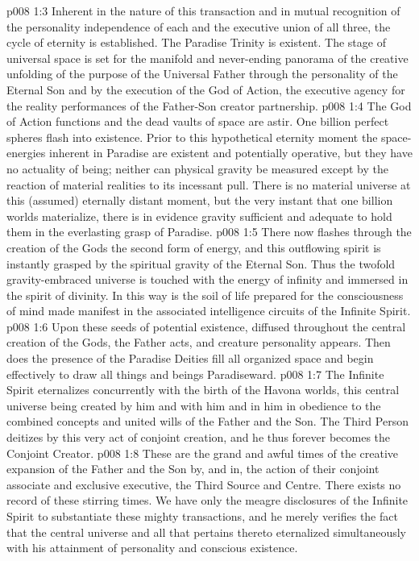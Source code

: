 \vs p008 1:3 Inherent in the nature of this transaction and in mutual recognition of the personality independence of each and the executive union of all three, the cycle of eternity is established. The Paradise Trinity is existent. The stage of universal space is set for the manifold and never\hyp{}ending panorama of the creative unfolding of the purpose of the Universal Father through the personality of the Eternal Son and by the execution of the God of Action, the executive agency for the reality performances of the Father\hyp{}Son creator partnership.
\vs p008 1:4 \pc The God of Action functions and the dead vaults of space are astir. One billion perfect spheres flash into existence. Prior to this hypothetical eternity moment the space\hyp{}energies inherent in Paradise are existent and potentially operative, but they have no actuality of being; neither can physical gravity be measured except by the reaction of material realities to its incessant pull. There is no material universe at this (assumed) eternally distant moment, but the very instant that one billion worlds materialize, there is in evidence gravity sufficient and adequate to hold them in the everlasting grasp of Paradise.
\vs p008 1:5 There now flashes through the creation of the Gods the second form of energy, and this outflowing spirit is instantly grasped by the spiritual gravity of the Eternal Son. Thus the twofold gravity\hyp{}embraced universe is touched with the energy of infinity and immersed in the spirit of divinity. In this way is the soil of life prepared for the consciousness of mind made manifest in the associated intelligence circuits of the Infinite Spirit.
\vs p008 1:6 Upon these seeds of potential existence, diffused throughout the central creation of the Gods, the Father acts, and creature personality appears. Then does the presence of the Paradise Deities fill all organized space and begin effectively to draw all things and beings Paradiseward.
\vs p008 1:7 \pc The Infinite Spirit eternalizes concurrently with the birth of the Havona worlds, this central universe being created by him and with him and in him in obedience to the combined concepts and united wills of the Father and the Son. The Third Person deitizes by this very act of conjoint creation, and he thus forever becomes the Conjoint Creator.
\vs p008 1:8 \pc These are the grand and awful times of the creative expansion of the Father and the Son by, and in, the action of their conjoint associate and exclusive executive, the Third Source and Centre. There exists no record of these stirring times. We have only the meagre disclosures of the Infinite Spirit to substantiate these mighty transactions, and he merely verifies the fact that the central universe and all that pertains thereto eternalized simultaneously with his attainment of personality and conscious existence.
